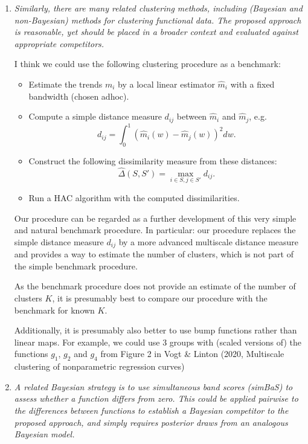 \documentclass[a4paper,12pt]{article}
\begin{document}
\begin{enumerate}[label=\arabic*.,leftmargin=0.6cm]
{\begin{itemize}[topsep=0pt]
  
\end{itemize}
}



\item \textit{Similarly, there are many related clustering methods, including (Bayesian and non-Bayesian) methods for clustering functional data. The proposed approach is reasonable, yet should be placed in a broader context and evaluated against appropriate competitors.}

{\color{blue}  
I think we could use the following clustering procedure as a benchmark:
\begin{itemize}[label=--,leftmargin=0.45cm,itemsep=0pt,topsep=0pt]
\item Estimate the trends $m_i$ by a local linear estimator $\hat{m}_i$ with a fixed bandwidth (chosen adhoc).
\item Compute a simple distance measure $d_{ij}$ between $\hat{m}_i$ and $\hat{m}_j$, e.g.
\[ d_{ij} = \int_0^1 (\hat{m}_i(w) - \hat{m}_j(w))^2 dw. \]
\item Construct the following dissimilarity measure from these distances:
\[ \hat{\Delta}(S,S') = \max_{i \in S,j \in S'} d_{ij}. \]
\item Run a HAC algorithm with the computed dissimilarities. 
\end{itemize}

Our procedure can be regarded as a further development of this very simple and natural benchmark procedure. In particular: our procedure replaces the simple distance measure $d_{ij}$ by a more advanced multiscale distance measure and provides a way to estimate the number of clusters, which is not part of the simple benchmark procedure.

As the benchmark procedure does not provide an estimate of the number of clusters $K$, it is presumably best to compare our procedure with the benchmark for known $K$. 

Additionally, it is presumably also better to use bump functions rather than linear maps. For example, we could use 3 groups with (scaled versions of) the functions $g_1$, $g_2$ and $g_4$ from Figure 2 in Vogt \& Linton (2020, Multiscale clustering of nonparametric regression curves)
}
  

\item \textit{A related Bayesian strategy is to use simultaneous band scores (simBaS) to assess whether a function differs from zero. This could be applied pairwise to the differences between functions to establish a Bayesian competitor to the proposed approach, and simply requires posterior draws from an analogous Bayesian model.}


\end{enumerate}
\end{document}
